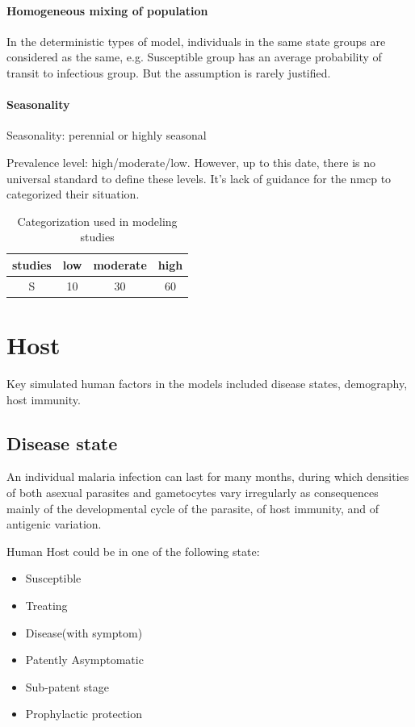 \documentclass[a4paper, 12pt, twoside]{article}
\begin{document}
\paragraph{Homogeneous mixing of population}%
\label{par:homogeneous_mixing_of_population}
In the deterministic types of model, individuals in the same state groups are considered as the same, e.g. Susceptible group has an average probability of transit to infectious group. But the assumption is rarely justified.

\paragraph{Seasonality}%
\label{par:seasonality}
Seasonality: perennial or highly seasonal

Prevalence level: high/moderate/low.
However, up to this date, there is no universal standard to define these levels.
It's lack of guidance for the \gls{nmcp} to categorized their situation.

\begin{table}
	\centering
	\begin{tabular}{c S S S}
		\toprule
		studies & {low} & {moderate} & {high} \\
		\midrule
		S       & 10    & 30         & 60     \\
		\bottomrule
	\end{tabular}
	\caption{Categorization used in modeling studies}
\end{table}

\section{Host}%
\label{sec:Host}

Key simulated human factors in the models included disease states, demography, host immunity.

\subsection{Disease state}

An individual malaria infection can last for many months, during which densities of both asexual parasites and gametocytes vary irregularly as consequences mainly of the developmental cycle of the parasite, of host immunity, and of antigenic variation.

Human Host could be in one of the following state:
\begin{itemize}
	\item Susceptible
	\item Treating
	\item Disease(with symptom)
	\item Patently Asymptomatic
	\item Sub-patent stage
	\item Prophylactic protection
\end{itemize}
\end{document}
